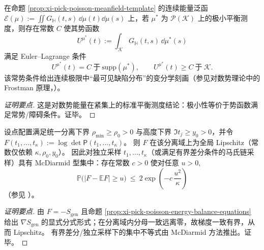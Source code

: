 \begin{corollary}\label{cor:xi-pick-poisson-equilibrium-euler-lagrange}
在命题 \ref{prop:xi-pick-poisson-meanfield-template} 的连续能量泛函
\(
\mathcal{E}(\mu):=\iint G_{\mathbb{H}}(t,s)\,\dd\mu(t)\dd\mu(s)
\)
上，若 \(\mu^\ast\) 为 \(\mathcal{P}(\mathcal{K})\) 上的极小平衡测度，则存在常数 \(C\) 使其势函数
\[
U^{\mu^\ast}(t):=\int_{\mathcal{K}}G_{\mathbb{H}}(t,s)\,\dd\mu^\ast(s)
\]
满足 Euler--Lagrange 条件
\[
\boxed{\;
U^{\mu^\ast}(t)=C\ \text{于}\ \mathrm{supp}(\mu^\ast),\qquad
U^{\mu^\ast}(t)\ge C\ \text{于}\ \mathcal{K}.\;}
\]
该常势条件给出连续极限中“最可见缺陷分布”的变分学刻画（参见对数势理论中的 Frostman 原理，\cite{SaffTotik1997LogarithmicPotentials}）。
\end{corollary}
\begin{proof}[证明要点]
这是对数势能量在紧集上的标准平衡测度结论：极小性等价于势函数满足常势/障碍条件。证毕。
\end{proof}

\begin{proposition}\label{prop:xi-pick-poisson-logdet-concentration}
设点配置满足统一分离下界 \(\rho_{\min}\ge\rho_0>0\) 与高度下界 \(\Im t_j\ge y_0>0\)，并令
\(
F(t_1,\dots,t_\kappa):=\log\det\mathsf P(t_1,\dots,t_\kappa)
\)。
则 \(F\) 在该分离域上为全局 Lipschitz（常数仅依赖 \(\kappa,\rho_0,y_0\)）。
因此对独立采样 \(t_1,\dots,t_\kappa\)（或满足有界差分条件的马氏链采样）具有 McDiarmid 型集中：存在常数 \(c>0\) 使对任意 \(u>0\),
\[
\boxed{\;
\mathbb{P}\bigl(|F-\mathbb{E}F|\ge u\bigr)\ \le\ 2\exp\!\left(-c\,\frac{u^2}{\kappa}\right)\;}
\]
（参见 \cite{McDiarmid1989BoundedDifferences}）。
\end{proposition}
\begin{proof}[证明要点]
由 \(F=-S_{\mathrm{gen}}\) 且命题 \ref{prop:xi-pick-poisson-energy-balance-equations} 给出 \(\nabla S_{\mathrm{gen}}\) 的显式分式形式；在分离域内分母一致远离零，故梯度一致有界，从而 Lipschitz。
有界差分/独立采样下的集中不等式由 McDiarmid 方法推出。证毕。
\end{proof}


